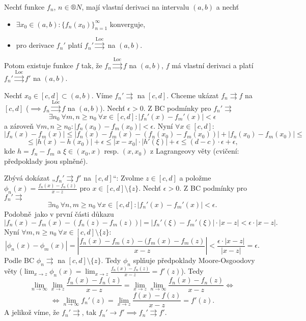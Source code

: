 \documentclass[12pt]{article}					%
\begin{document}
	\begin{veta}
		Nechť funkce $f_n$, $n \in ®N$, mají vlastní derivaci na intervalu $(a, b)$ a nechť

		\begin{itemize}
			\item $\exists x_0 \in (a, b): \{f_n(x_0)\}_{n=1}^∞$ konverguje,
			\item pro derivace $f_n'$ platí $f_n' \overset{\text{Loc}}{\rightrightarrows}$ na $(a, b)$.
		\end{itemize}

		Potom existuje funkce $f$ tak, že $f_n \overset{\text{Loc}}{\rightrightarrows} f$ na $(a, b)$, $f$ má vlastní derivaci a platí $f_n' \overset{\text{Loc}}{\rightrightarrows} f'$ na $(a, b)$.

		\begin{dukazin}
			Nechť $x_0 \in [c, d] \subset (a, b)$. Víme $f_n' \rightrightarrows$ na $[c, d]$. Chceme ukázat $f_n \rightrightarrows f$ na $[c, d]$ ($\implies f_n \overset{\text{Loc}}{\rightrightarrows} f$ na $(a, b)$). Nechť $\epsilon > 0$. Z BC podmínky pro $f_n' \rightrightarrows$
			$$ \exists n_0\ \forall m, n ≥ n_0\ \forall x \in [c, d]: |f_n'(x) - f_m'(x)| < \epsilon $$
			a zároveň $\forall m, n ≥ n_0: |f_n(x_0) - f_m(x_0)| < \epsilon$. Nyní $\forall x \in [c, d]:$
			$$ |f_n(x) - f_m(x)| ≤ |f_n(x) - f_m(x) - (f_n(x_0) - f_m(x_0))| + |f_n(x_0) - f_m(x_0)| ≤ $$
			$$ ≤ |h(x) - h(x_0)| + \epsilon ≤ |x - x_0|·|h'(\xi)| + \epsilon ≤ (d - c)·\epsilon + \epsilon, $$
			kde $h = f_n - f_m$ a $\xi \in (x_0, x)$ resp. $(x, x_0)$ z Lagrangeovy věty (cvičení: předpoklady jsou splněné).

			Zbývá dokázat „$f_n' \rightrightarrows f'$ na $[c, d]$“: Zvolme $z \in [c, d]$ a položme $\phi_n(x) = \frac{f_n(x) - f_n(z)}{x - z}$ pro $x \in [c, d] \setminus \{z\}$. Nechť $\epsilon > 0$. Z BC podmínky pro $f_n' \rightrightarrows$
			$$ \exists n_0\ \forall n, m ≥ n_0\ \forall x \in [c, d]: |f_n'(x) - f_m'(x)| < \epsilon. $$
			Podobně jako v první části důkazu
			$$ |f_n(x) - f_m(x) - (f_n(z) - f_m(z))| = |f_n'(\xi) - f_m'(\xi)|·|x - z| < \epsilon·|x - z|. $$
			Nyní $\forall m, n ≥ n_0\ \forall x \in [c, d]\setminus\{z\}$:
			$$ |\phi_n(x) - \phi_m(x)| = \left| \frac{f_n(x) - f_m(z) - (f_m(x) - f_m(z)}{x - z} \right| < \frac{\epsilon·|x - z|}{|x - z|} = \epsilon. $$
			Podle BC $\phi_n \rightrightarrows$ na $[c, d] \setminus \{z\}$. Tedy $\phi_n$ splňuje předpoklady Moore-Osgoodovy věty ($\lim_{x \rightarrow z} \phi_n(x) = \lim_{x \rightarrow z} \frac{f_n(x) - f_n(z)}{x - z} = f'(z)$). Tedy
			$$ \lim_{n \rightarrow ∞} \lim_{x \rightarrow z} \frac{f_n(x) - f_n(z)}{x - z} = \lim_{x \rightarrow z} \lim_{n \rightarrow ∞} \frac{f_n(x) - f_n(z)}{x - z} \Leftrightarrow $$
			$$ \Leftrightarrow \lim_{n \rightarrow ∞} f_n'(z) = \lim_{x \rightarrow z} \frac{f(x) - f(z)}{x - z} = f'(z). $$
			A jelikož víme, že $f_n' \rightrightarrows$, tak $f_n' \rightarrow f' \implies f_n' \rightrightarrows f'$.
		\end{dukazin}
	\end{veta}
\end{document}
